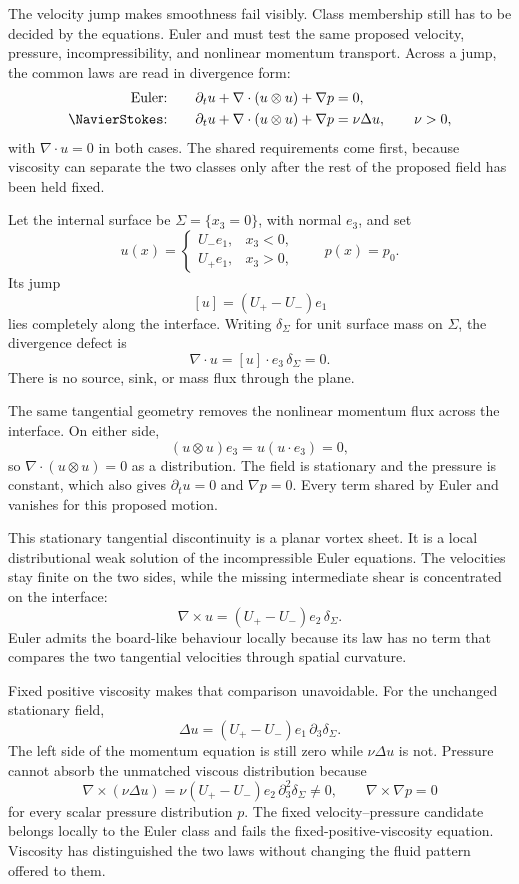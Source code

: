 

The velocity jump makes smoothness fail visibly.
Class membership still has to be decided by the equations.
Euler and \NavierStokes{} must test the same proposed velocity, pressure, incompressibility, and nonlinear momentum transport.
Across a jump, the common laws are read in divergence form:
\[
  \begin{aligned}
  \text{Euler:}\qquad
  &\partial_tu+\nabla\cdot(u\otimes u)+\nabla p=0,\\
  \text{\NavierStokes:}\qquad
  &\partial_tu+\nabla\cdot(u\otimes u)+\nabla p=\nu\Delta u,
  \qquad \nu>0,
  \end{aligned}
\]
with \(\nabla\cdot u=0\) in both cases.
The shared requirements come first, because viscosity can separate the two classes only after the rest of the proposed field has been held fixed.

Let the internal surface be \(\Sigma=\{x_3=0\}\), with normal \(e_3\), and set
\[
  u(x)
  =
  \begin{cases}
    U_-e_1, & x_3<0,\\
    U_+e_1, & x_3>0,
  \end{cases}
  \qquad
  p(x)=p_0.
\]
Its jump
\[
  [u]=(U_+-U_-)e_1
\]
lies completely along the interface.
Writing \(\delta_\Sigma\) for unit surface mass on \(\Sigma\), the divergence defect is
\[
  \nabla\cdot u
  =
  [u]\cdot e_3\,\delta_\Sigma
  =0.
\]
There is no source, sink, or mass flux through the plane.

The same tangential geometry removes the nonlinear momentum flux across the interface.
On either side,
\[
  (u\otimes u)e_3
  =
  u(u\cdot e_3)
  =0,
\]
so \(\nabla\cdot(u\otimes u)=0\) as a distribution.
The field is stationary and the pressure is constant, which also gives \(\partial_tu=0\) and \(\nabla p=0\).
Every term shared by Euler and \NavierStokes{} vanishes for this proposed motion.

This stationary tangential discontinuity is a planar vortex sheet.
It is a local distributional weak solution of the incompressible Euler equations.
The velocities stay finite on the two sides, while the missing intermediate shear is concentrated on the interface:
\[
  \nabla\times u
  =
  (U_+-U_-)e_2\,\delta_\Sigma.
\]
Euler admits the board-like behaviour locally because its law has no term that compares the two tangential velocities through spatial curvature.

Fixed positive viscosity makes that comparison unavoidable.
For the unchanged stationary field,
\[
  \Delta u
  =
  (U_+-U_-)e_1\,\partial_3\delta_\Sigma.
\]
The left side of the momentum equation is still zero while \(\nu\Delta u\) is not.
Pressure cannot absorb the unmatched viscous distribution because
\[
  \nabla\times(\nu\Delta u)
  =
  \nu(U_+-U_-)e_2\,\partial_3^2\delta_\Sigma
  \neq0,
  \qquad
  \nabla\times\nabla p=0
\]
for every scalar pressure distribution \(p\).
The fixed velocity--pressure candidate belongs locally to the Euler class and fails the fixed-positive-viscosity \NavierStokes{} equation.
Viscosity has distinguished the two laws without changing the fluid pattern offered to them.

